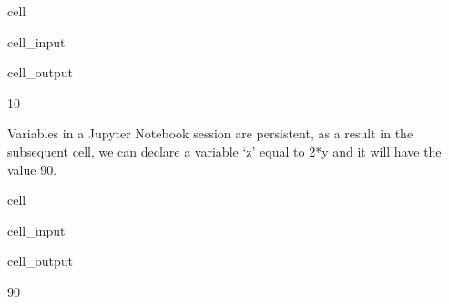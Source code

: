 \documentclass[letterpaper,10pt,english]{jupyterBook}
\begin{document}
\begin{sphinxuseclass}{cell}\begin{sphinxVerbatimInput}

\begin{sphinxuseclass}{cell_input}
\begin{sphinxVerbatim}[commandchars=\\\{\}]
  
\end{sphinxVerbatim}

\end{sphinxuseclass}\end{sphinxVerbatimInput}
\begin{sphinxVerbatimOutput}

\begin{sphinxuseclass}{cell_output}
\begin{sphinxVerbatim}[commandchars=\\\{\}]
10
\end{sphinxVerbatim}

\end{sphinxuseclass}\end{sphinxVerbatimOutput}

\end{sphinxuseclass}
\sphinxAtStartPar
Variables in a Jupyter Notebook session are persistent, as a result in the subsequent cell, we can declare a variable ‘z’ equal to 2*y and it will have the value 90.

\begin{sphinxuseclass}{cell}\begin{sphinxVerbatimInput}

\begin{sphinxuseclass}{cell_input}
\begin{sphinxVerbatim}[commandchars=\\\{\}]
\end{sphinxVerbatim}

\end{sphinxuseclass}\end{sphinxVerbatimInput}
\begin{sphinxVerbatimOutput}

\begin{sphinxuseclass}{cell_output}
\begin{sphinxVerbatim}[commandchars=\\\{\}]
90
\end{sphinxVerbatim}

\end{sphinxuseclass}\end{sphinxVerbatimOutput}

\end{sphinxuseclass}
\end{document}
